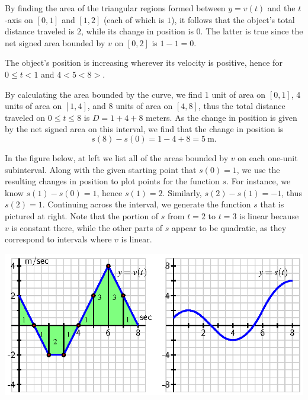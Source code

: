 \begin{activitySolution}
\ba
	\item By finding the area of the triangular regions formed between $y = v(t)$ and the $t$-axis on $[0,1]$ and $[1,2]$ (each of which is $1$), it follows that the object's total distance traveled is $2$, while its change in position is $0$.  The latter is true since the net signed area bounded by $v$ on $[0,2]$ is $1 - 1 = 0$.
	\item The object's position is increasing wherever its velocity is positive, hence for $0 \le t < 1$ and $4 < 5 < 8>$.
	\item By calculating the area bounded by the curve, we find 1 unit of area on $[0,1]$, 4 units of area on $[1,4]$, and 8 units of area on $[4,8]$, thus the total distance traveled on $0 \le t \le 8$ is $D = 1 + 4 + 8$ meters.  As the change in position is given by the net signed area on this interval, we find that the change in position is
	$$s(8) - s(0) = 1 - 4 + 8 = 5 \ \mbox{m}.$$
	\item In the figure below, at left we list all of the areas bounded by $v$ on each one-unit subinterval.  Along with the given starting point that $s(0) = 1$, we use the resulting changes in position to plot points for the function $s$.  For instance, we know $s(1) - s(0) = 1$, hence $s(1) = 2$.  Similarly, $s(2) - s(1) = -1$, thus $s(2) = 1$.  Continuing across the interval, we generate the function $s$ that is pictured at right.  Note that the portion of $s$ from $t = 2$ to $t = 3$ is linear because $v$ is constant there, while the other parts of $s$ appear to be quadratic, as they correspond to intervals where $v$ is linear.
\ea
\begin{center}
\includegraphics{figures/4_1_Act3Soln.eps}
\end{center}
\end{activitySolution}
\aftera







